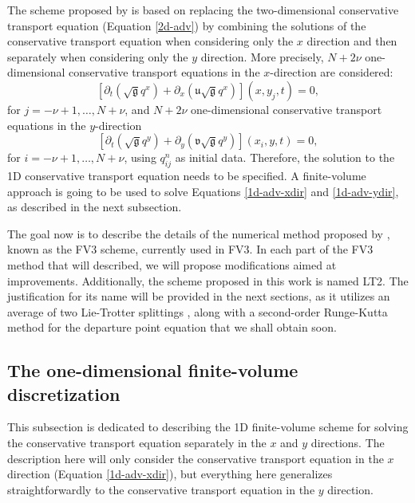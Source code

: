 \documentclass[preprint,12pt]{elsarticle}
\begin{document}
\begin{linenumbers}
The scheme proposed by \cite{lin:1996} is based on replacing the two-dimensional conservative transport equation (Equation \eqref{2d-adv}) by combining the solutions of the conservative transport equation when considering only the $x$ direction and then separately when considering only the $y$ direction.
More precisely, $N+2\nu$ one-dimensional conservative transport equations in the $x$-direction are considered:
\begin{equation}
	\label{1d-adv-xdir}
	[{\partial_t (\sqrt{\mathfrak{g}}q^x)}+{\partial_x (\mathfrak{u}\sqrt{\mathfrak{g}}q^x)}](x, y_j, t) = 0,
\end{equation}
for $j=-\nu+1, \ldots, N + \nu$, and
$N+2\nu$ one-dimensional conservative transport equations in the $y$-direction
\begin{equation}
	\label{1d-adv-ydir}
	[{\partial_t (\sqrt{\mathfrak{g}}q^y)} +{\partial_y (\mathfrak{v}\sqrt{\mathfrak{g}}q^y)}](x_i, y, t) = 0,
\end{equation}
for $i=-\nu+1, \ldots, N + \nu$, using $q_{ij}^n$ as initial data.
Therefore, the solution to the 1D conservative transport equation needs to be specified.
A finite-volume approach is going to be used to solve Equations \eqref{1d-adv-xdir} and \eqref{1d-adv-ydir}, as described in the next subsection.


The goal now is to describe the details of the numerical method proposed by \citep{putman:2007}, known as the FV3 scheme, currently used in FV3.
In each part of the FV3 method that will described, we will propose modifications aimed at improvements. 
Additionally, the scheme proposed in this work is named LT2.
The justification for its name will be provided in the next sections, as it utilizes an average of two Lie-Trotter splittings \cite{holden:2010}, along with a second-order Runge-Kutta method for the departure point equation that we shall obtain soon.


\subsection{The one-dimensional finite-volume discretization}
\label{1d-adv}
This subsection is dedicated to describing the 1D finite-volume scheme for solving the conservative transport equation separately in the $x$ and $y$ directions.
The description here will only consider the conservative transport equation in the $x$ direction (Equation \ref{1d-adv-xdir}), but everything here generalizes straightforwardly to the conservative transport equation in the $y$ direction.


\end{linenumbers}
\end{document}
